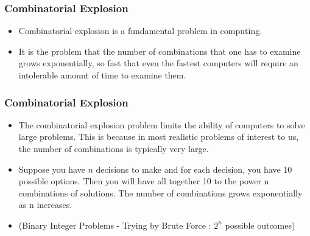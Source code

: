 \documentclass{beamer}
\begin{document}
\begin{frame}
	\frametitle{Combinatorial Explosion}
	\large
	\begin{itemize}
		\item 	Combinatorial explosion is a fundamental problem in computing. 
		\item It is the problem that the number of combinations that one has to examine grows exponentially, so fast that even the fastest computers will require an intolerable amount of time to examine them.
		
	\end{itemize}
\end{frame}
%	





\begin{frame}
\frametitle{Combinatorial Explosion}
\large
\begin{itemize}
	\item 	The combinatorial explosion problem limits the ability of computers to solve large problems. This is because in most realistic problems of interest to us, the number of combinations is typically very large.
	
	\item Suppose you have $n$ decisions to make and for each decision, you have 10 possible options. Then you will have all together 10 to the power n combinations of solutions. The number of combinations grows exponentially as n increases.
	\item (Binary Integer Problems - Trying by Brute Force : $2^n$ possible outcomes)
\end{itemize}	

	
	
\end{frame}
\end{document}
